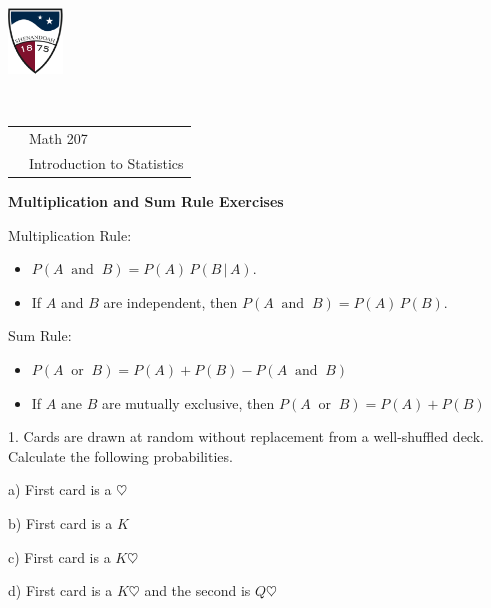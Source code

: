 \documentclass[10pt]{article}
\begin{document}
\pagestyle{empty}
\lstset{language=R, showspaces=false, showstringspaces=false}

\href{http://www.su.edu}{\includegraphics[height=1.75cm]{sulogo.eps}}
\vspace{-1.69cm}

{\small{\ }\hfill
\begin{tabular}{cl}
& Math 207\\
& Introduction to Statistics\\
\end{tabular}
}
\setlength{\baselineskip}{1.05\baselineskip}
\medskip

\begin{center}
\textbf{\large  Multiplication and Sum Rule Exercises}
\end{center}\vspace{-5pt}
\newcommand{\Z}{\hphantom{0}}

Multiplication Rule:  
\begin{itemize}
\item $P(A\;\;\mbox{and}\;\;B)=P(A)\,P(B\,\vert\,A)$.
\item If $A$ and $B$ are independent, then $P(A\;\;\mbox{and}\;\;B)=P(A)\,P(B)$.
\end{itemize}
Sum Rule:
\begin{itemize}
\item $P(A\;\;\mbox{or}\;\;B)=P(A)+P(B) - P(A\;\;\mbox{and}\;\;B)$
\item If $A$ ane $B$ are mutually exclusive, then $P(A\;\;\mbox{or}\;\;B)=P(A)+P(B)$
\end{itemize}  
\bigskip

1. Cards are drawn at random without replacement from a 
well-shuffled deck. Calculate the following probabilities.
\medskip

\hspace{20pt} a) First card is a $\heartsuit$
\bigskip\medskip

\hspace{20pt} b) First card is a $K$
\bigskip\medskip

\hspace{20pt} c) First card is a $K\heartsuit$
\bigskip\medskip

\hspace{20pt} d) First card is a $K\heartsuit$ and the second is $Q\heartsuit$
\bigskip\medskip
\end{document}
